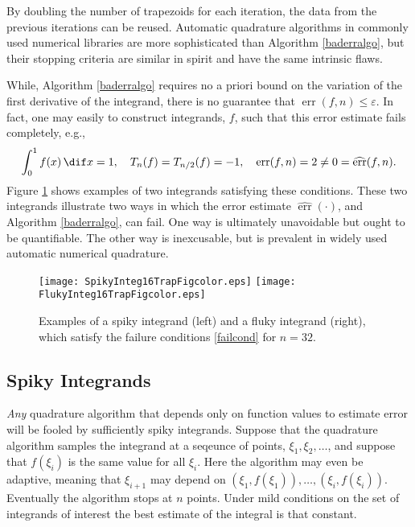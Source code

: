 \documentclass[]{amsart}
\DeclareMathOperator{\err}{err}
\newcommand{\herr}{\widehat{\err}}
\theoremstyle{definition}
\theoremstyle{remark}
\begin{document}
By doubling the number of trapezoids for each iteration, the data from the previous iterations can be reused.  Automatic quadrature algorithms in commonly used numerical libraries are more sophisticated than Algorithm \ref{baderralgo}, but their stopping criteria are similar in spirit and have the same intrinsic flaws.

While, Algorithm \ref{baderralgo} requires no a priori bound on the variation of the first derivative of the integrand, there is no guarantee that $\err(f,n)\le \varepsilon$.  In fact, one may easily to construct integrands, $f$, such that this error estimate fails completely, e.g.,
\begin{equation} \label{failcond}
\int_0^1 f(x) \, \dif x =  1, \quad T_{n}(f)=T_{n/2}(f) = -1, \quad \err(f,n)=2 \ne 0 = \herr(f,n).
\end{equation}
Figure \ref{spikeflukefig} shows  examples of two integrands satisfying these conditions. These two integrands illustrate two ways in which the error estimate $\herr(\cdot)$, and Algorithm \ref{baderralgo}, can fail.  One way is ultimately unavoidable but ought to be quantifiable.  The other way is inexcusable, but is prevalent in widely used automatic numerical quadrature.

\begin{figure}
\centering 
\texttt{[image: SpikyInteg16TrapFigcolor.eps]} \quad
\texttt{[image: FlukyInteg16TrapFigcolor.eps]}
\caption{Examples of a spiky integrand (left) and a fluky integrand (right), which satisfy the failure conditions \eqref{failcond} for $n=32$. \label{spikeflukefig}}
\end{figure}

\subsection{Spiky Integrands} \emph{Any} quadrature algorithm that depends only on function values to estimate error will be fooled by sufficiently spiky integrands.  Suppose that the quadrature algorithm samples the integrand at a seqeunce of points, $\xi_1, \xi_2, \ldots$, and suppose that $f(\xi_i)$ is the same value for all $\xi_i$.  Here the algorithm may even be adaptive, meaning that $\xi_{i+1}$ may depend on $(\xi_1, f(\xi_1)), \ldots, (\xi_i, f(\xi_i))$.  Eventually the algorithm stops at $n$ points.  Under mild conditions on the set of integrands of interest the best estimate of the integral is that constant. 
\end{document}

